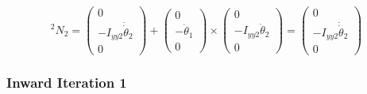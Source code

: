 \documentclass[10pt,a4paper]{article}
\begin{document}
\begin{equation*}
  {}^{2}N_{2} = \begin{pmatrix}
    0\\-I_{yy2}\dot{\dot{\theta}}_{2}\\0
  \end{pmatrix} + \begin{pmatrix}
    0\\-\dot{\theta}_{1}\\0
  \end{pmatrix} \times \begin{pmatrix}
    0\\-I_{yy2}\dot{\theta}_{2}\\0
  \end{pmatrix} = \begin{pmatrix}
    0\\
    -I_{yy2}\dot{\dot{\theta}}_{2}\\
    0
  \end{pmatrix}
\end{equation*}

\subsubsection*{Inward Iteration 1}
\end{document}
